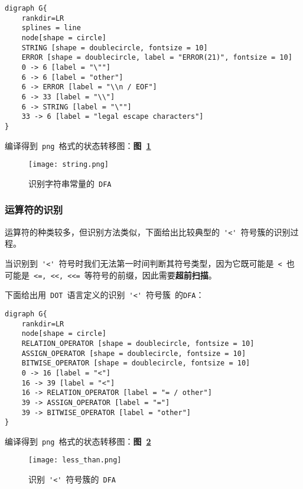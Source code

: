 \documentclass[lang=cn,11pt,a4paper]{paper}
\begin{document}
\begin{lstlisting}
digraph G{
    rankdir=LR
    splines = line
    node[shape = circle]
    STRING [shape = doublecircle, fontsize = 10]
    ERROR [shape = doublecircle, label = "ERROR(21)", fontsize = 10]
    0 -> 6 [label = "\""]
    6 -> 6 [label = "other"]
    6 -> ERROR [label = "\\n / EOF"]
    6 -> 33 [label = "\\"]
    6 -> STRING [label = "\""]
    33 -> 6 [label = "legal escape characters"]
}
\end{lstlisting}

编译得到\ \lstinline{png}\ 格式的状态转移图：\textbf{图\ \ref{fig:识别字符串常量的DFA}}

\begin{figure}[!htb]
    \centering
    \texttt{[image: string.png]}
    \caption{识别字符串常量的\ \lstinline{DFA}}
    \label{fig:识别字符串常量的DFA}
\end{figure}

\subsubsection{运算符的识别}

运算符的种类较多，但识别方法类似，下面给出比较典型的\ \lstinline{'<'}\ 符号簇的识别过程。

当识别到\ \lstinline{'<'}\ 符号时我们无法第一时间判断其符号类型，因为它既可能是\ \lstinline{<}\ 也可能是\ \lstinline{<=, <<, <<=}\ 等符号的前缀，因此需要\textbf{超前扫描}。

下面给出用\ \lstinline{DOT}\ 语言定义的识别\ \lstinline{'<'}\ 符号簇\ 的\lstinline{DFA}：

\begin{lstlisting}
digraph G{
    rankdir=LR
    node[shape = circle]
    RELATION_OPERATOR [shape = doublecircle, fontsize = 10]
    ASSIGN_OPERATOR [shape = doublecircle, fontsize = 10]
    BITWISE_OPERATOR [shape = doublecircle, fontsize = 10]
    0 -> 16 [label = "<"]
    16 -> 39 [label = "<"]
    16 -> RELATION_OPERATOR [label = "= / other"]
    39 -> ASSIGN_OPERATOR [label = "="]
    39 -> BITWISE_OPERATOR [label = "other"]
}
\end{lstlisting}

编译得到\ \lstinline{png}\ 格式的状态转移图：\textbf{图\ \ref{fig:识别 '<' 符号簇的DFA}}

\begin{figure}[!htb]
    \centering
    \texttt{[image: less\_than.png]}
    \caption{识别\ \lstinline{'<'}\ 符号簇的\ \lstinline{DFA}}
    \label{fig:识别 '<' 符号簇的DFA}
\end{figure}
\end{document}
